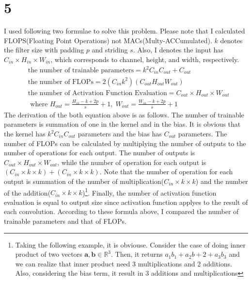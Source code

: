 \documentclass[10pt]{article}
\begin{document}
\section*{5}
I used following two formulae to solve this problem. Please note that I calculated FLOPS(Floating Point Operations) not MACs(Multy-ACCumulated).
$k$ denotes the filter size with padding $p$ and striding $s$. Also, I denotes the input has $C_{in} \times H_{in} \times W_{in}$, which corresponds to channel, height, and width, respectively.
\begin{align}
    &\text{the number of trainable parameters} = k^2C_{in}C_{out} + C_{out}\\
    &\text{the number of FLOPs} = 2(C_{in} k^2)(C_{out}H_{out}W_{out})\\ 
    &\text{the number of Activation Function Evaluation} = C_{out}\times H_{out} \times W_{out}\\
    &\text{ where } H_{out} = \frac{H_{in} - k + 2p}{s} + 1,\; W_{out} = \frac{W_{in} - k + 2p}{s} + 1
\end{align}
The derivation of the both equation above is as follows.
The number of trainable parameters is summation of one in the kernel and in the bias. 
It is obvious that the kernel has $k^2C_{in}C_{out}$ parameters and the bias has $C_{out}$ parameters.
The number of FLOPs can be calculated by multiplying the number of outputs to the number of operations for each output. 
The number of outputs is $C_{out}\times H_{out} \times W_{out}$, while the number of operation for each output is $(C_{in}\times k \times k) + (C_{in}\times k \times k)$.
Note that the number of operation for each output is summation of the number of multiplication($C_{in}\times k\times k$) and the number of the addition($C_{in}\times k\times k$)\footnote{Taking the following example, it is obviouse. Consider the case of doing inner product of two vectors $\mathbf{a,b}\in\mathbb{R}^3$. Then, it returns $a_1b_1 + a_2b+2 + a_3b_3$ and we can realize that inner product need 3 multiplications and 2 additions. Also, considering the bias term, it result in 3 additions and multiplications}.
Finally, the number of activation function evaluation is equal to output size since activation function applyes to the result of each convolution.
According to these formula above, I compared the number of trainable parameters and that of FLOPs.
\end{document}
